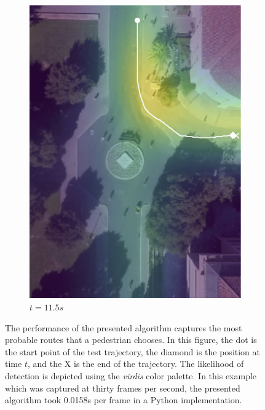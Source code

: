 \documentclass[letterpaper,10pt,conference]{ieeeconf}
\begin{document}
\begin{figure}
\begin{subfigure}[b]{.45\linewidth}
		\includegraphics[width=\linewidth]{./figures/FirstPage/gates_1_2_t=345.jpg}
		\caption{$t=11.5s$}
	\end{subfigure}
	\caption{The performance of the presented algorithm captures the most probable routes that a pedestrian chooses.  In this figure, the dot is the start point of the test trajectory, the diamond is the position at time $t$, and the X is the end of the trajectory. The likelihood of detection is depicted using the \textit{virdis} color palette. In this example which was captured at thirty frames per second, the presented algorithm took 0.0158s per frame in a Python implementation. }
	\label{fig:gates-1-2}
\end{figure}

\end{document}
